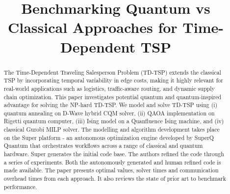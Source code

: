 \documentclass[conference]{IEEEtran}
\begin{document}
\title{Benchmarking Quantum vs Classical Approaches for Time-Dependent TSP}

\author{
\and
{}
\and
{}
}

\maketitle

\begin{abstract}
The Time-Dependent Traveling Salesperson Problem (TD-TSP) extends the classical TSP by incorporating temporal variability in edge costs, making it highly relevant for real-world applications such as logistics, traffic-aware routing, and dynamic supply chain optimization. This paper investigates potential quantum and quantum-inspired advantage for solving the NP-hard TD-TSP. We model and solve TD-TSP using (i) quantum annealing on D-Wave hybrid CQM solver, (ii) QAOA implementation on Rigetti quantum computer, (iii) Ising model on a Quanfluence Ising machine, and (iv) classical Gurobi MILP solver. The modelling and algorithm development takes place on the Super platform - an autonomous optimization engine developed by SuperQ Quantum that orchestrates workflows across a range of classical and quantum hardware. Super generates the initial code base. The authors refined the code through a series of experiments. Both the autonomously generated and human refined code is made available. The paper presents optimal values, solver times and communication overhead times from each approach. It also reviews the state of prior art to benchmark performance. 
\end{abstract}
\end{document}
